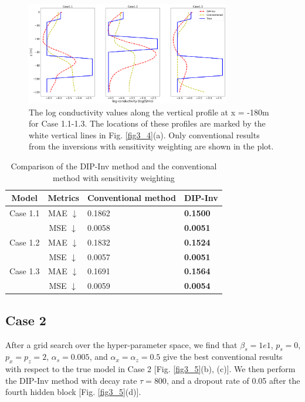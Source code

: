 \documentclass[lettersize,journal]{IEEEtran}
\begin{document}
\begin{figure}[h!]
\centering
\includegraphics[width=3.5in]{Figures/xu8.png}
\caption{The log conductivity values along the vertical profile at x = -180m for Case 1.1-1.3. The locations of these profiles are marked by the white vertical lines in Fig. \ref{fig3_4}(a). Only conventional results from the inversions with sensitivity weighting are shown in the plot.}
\label{fig3_4.5}
\end{figure}

\begin{table}[b!]
\centering
\caption{Comparison of the DIP-Inv method and the conventional method with sensitivity weighting}
\begin{tabular}{|c|c|l|l|}
\hline
Model & Metrics & Conventional method & DIP-Inv\\
\hline
Case 1.1 & MAE $\downarrow$ & 0.1862 & \textbf{0.1500}\\
 & MSE $\downarrow$ & 0.0058 & \textbf{0.0051}\\
\hline
Case 1.2 & MAE $\downarrow$ & 0.1832 & \textbf{0.1524}\\
 & MSE $\downarrow$ & 0.0057 & \textbf{0.0051}\\
\hline
Case 1.3 & MAE $\downarrow$ & 0.1691 & \textbf{0.1564}\\
 & MSE $\downarrow$ & 0.0059 & \textbf{0.0054}\\ 
\hline
\end{tabular}
\label{table:7}
\end{table}

\subsection{Case 2}
\label{sec:3.4}
After a grid search over the hyper-parameter space, we find that $\beta_s = 1e1$, $p_s = 0$, $p_x = p_z = 2$, $\alpha_s = 0.005$, and $\alpha_x = \alpha_z = 0.5$ give the best conventional results with respect to the true model in Case 2 [Fig. \ref{fig3_5}(b), (c)]. We then perform the DIP-Inv method with decay rate $\tau = 800$, and a dropout rate of 0.05 after the fourth hidden block [Fig. \ref{fig3_5}(d)]. 
\end{document}
